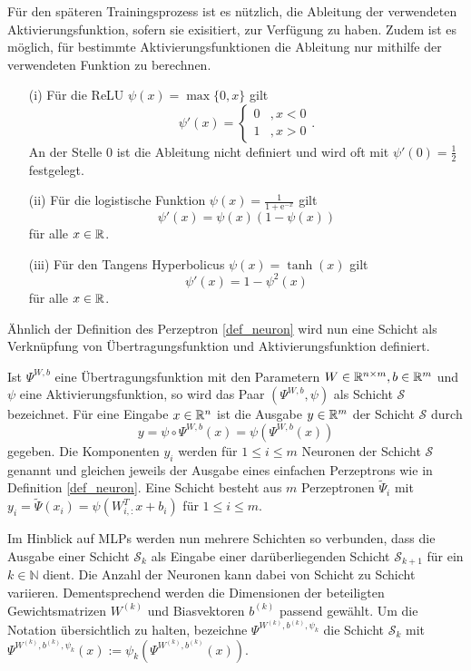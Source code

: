 Für den späteren Trainingsprozess ist es nützlich, die Ableitung der verwendeten Aktivierungsfunktion, sofern sie exisitiert, zur Verfügung zu haben. Zudem ist es möglich, für bestimmte Aktivierungsfunktionen die Ableitung nur mithilfe der verwendeten Funktion zu berechnen.

\begin{lem}
    \begin{itemize}
        \item[(i)] Für die ReLU $\psi(x)=\max\{0,x\}$ gilt
         \[\psi'(x)=\begin{cases}
            0 &, x <0 \\
            1 &, x >0
        \end{cases}. 
        \]
        An der Stelle 0 ist die Ableitung nicht definiert und wird oft mit $\psi'(0)=\frac{1}{2}$ festgelegt.
        \item[(ii)] Für die logistische Funktion $\psi(x)=\frac{1}{1+\mathrm{e}^{-x}}$ gilt
        \[ 
            \psi'(x)=\psi(x)(1-\psi(x)) 
        \]
        für alle $x \in \mathbb{R}$.
        \item[(iii)] Für den Tangens Hyperbolicus $\psi(x)=\tanh(x)$ gilt
        \[ 
            \psi'(x)=1-\psi^2(x) 
        \]
        für alle $x \in \mathbb{R}$.
    \end{itemize}
\end{lem}


Ähnlich der Definition des Perzeptron \ref{def_neuron} wird nun eine Schicht als Verknüpfung von Übertragungsfunktion und Aktivierungsfunktion definiert.

\begin{defi}[Neuronenschicht]
    Ist $\Psi^{W,b}$ eine Übertragungsfunktion mit den Parametern $W \in \mathbb{R}^{n \times m}, b \in \mathbb{R}^m$ und $\psi$ eine Aktivierungsfunktion, so wird das Paar $(\Psi^{W,b}, \psi)$ als Schicht $\mathcal{S}$ bezeichnet. Für eine Eingabe $x \in \mathbb{R}^n$ ist die Ausgabe $y \in \mathbb{R}^m$ der Schicht $\mathcal{S}$ durch
    \[y=\psi \circ \Psi^{W,b}(x)= \psi\left(\Psi^{W,b}(x)\right)
        \] 
        gegeben. Die Komponenten $y_i$ werden für $1 \leq i \leq m$ Neuronen der Schicht $\mathcal{S}$ genannt und gleichen jeweils der Ausgabe eines einfachen Perzeptrons wie in Definition \ref{def_neuron}. Eine Schicht besteht aus $m$ Perzeptronen $\tilde{\Psi}_i$ mit $y_i=\tilde{\Psi}(x_i)=\psi(W_{i,:}^T x+b_i)$ für $1 \leq i \leq m$.
\end{defi}
Im Hinblick auf MLPs werden nun mehrere Schichten so verbunden, dass die Ausgabe einer Schicht $\mathcal{S}_k$ als Eingabe einer darüberliegenden Schicht $\mathcal{S}_{k+1}$ für ein $k \in \mathbb{N}$ dient. Die Anzahl der Neuronen kann dabei von Schicht zu Schicht variieren. Dementsprechend werden die Dimensionen der beteiligten Gewichtsmatrizen $W^{(k)}$ und Biasvektoren $b^{(k)}$ passend gewählt. 
Um die Notation übersichtlich zu halten, bezeichne $\Psi^{W^{(k)},b^{(k)},\psi_{k}}$ die Schicht $\mathcal{S}_k$ mit $\Psi^{W^{(k)},b^{(k)},\psi_{k}}(x):= \psi_{k} \left(\Psi^{W^{(k)},b^{(k)}}(x)\right)$.

